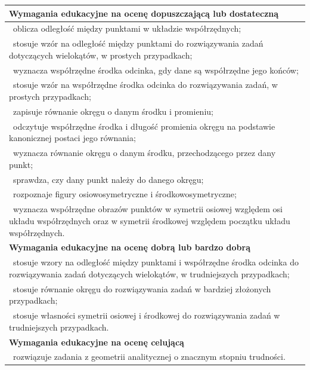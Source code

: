 \documentclass[12pt,a4paper]{article}
\begin{document}
	\begin{longtable}{|p{16cm}|}
		\hline
		
		\textbf{Wymagania edukacyjne na ocenę dopuszczającą lub dostateczną} \\ \hline
		
		\textbullet\ oblicza odległość między punktami w układzie współrzędnych; \\
		
		\textbullet\ stosuje wzór na odległość między punktami do rozwiązywania zadań dotyczących wielokątów, w prostych przypadkach; \\
		
		\textbullet\ wyznacza współrzędne środka odcinka, gdy dane są współrzędne jego końców; \\
		
		\textbullet\ stosuje wzór na współrzędne środka odcinka do rozwiązywania zadań, w prostych przypadkach; \\
		
		\textbullet\ zapisuje równanie okręgu o danym środku i promieniu; \\
		
		\textbullet\ odczytuje współrzędne środka i długość promienia okręgu na podstawie kanonicznej postaci jego równania; \\
		
		\textbullet\ wyznacza równanie okręgu o danym środku, przechodzącego przez dany punkt; \\
		
		\textbullet\ sprawdza, czy dany punkt należy do danego okręgu; \\
		
		\textbullet\ rozpoznaje figury osiowosymetryczne i środkowosymetryczne; \\
		
		\textbullet\ wyznacza współrzędne obrazów punktów w symetrii osiowej względem osi układu współrzędnych oraz w symetrii środkowej względem początku układu współrzędnych. \\ \hline
		
		\textbf{Wymagania edukacyjne na ocenę dobrą lub bardzo dobrą} \\ \hline
		
		\textbullet\ stosuje wzory na odległość między punktami i współrzędne środka odcinka do rozwiązywania zadań dotyczących wielokątów, w trudniejszych przypadkach; \\
		
		\textbullet\ stosuje równanie okręgu do rozwiązywania zadań w bardziej złożonych przypadkach; \\
		
		\textbullet\ stosuje własności symetrii osiowej i środkowej do rozwiązywania zadań w trudniejszych przypadkach. \\ \hline
		
		\textbf{Wymagania edukacyjne na ocenę celującą} \\ \hline
		
		\textbullet\ rozwiązuje zadania z geometrii analitycznej o znacznym stopniu trudności. \\ \hline
		
	\end{longtable}
	
\end{document}
